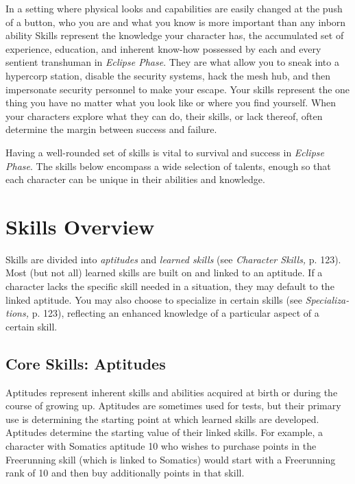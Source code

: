 In a setting where physical looks and capabilities are 
easily changed at the push of a button, who you are and 
what you know is more important than any inborn ability
Skills represent the knowledge your character has,
the accumulated set of experience, education, and inherent
know-how possessed by each and every sentient
transhuman in \textit{Eclipse Phase}. They are what allow you 
to sneak into a hypercorp station, disable the security 
systems, hack the mesh hub, and then impersonate security
personnel to make your escape. Your skills represent
the one thing you have no matter what you look like or 
where you find yourself. When your characters explore 
what they can do, their skills, or lack thereof, often determine
the margin between success and failure.

Having a well-rounded set of skills is vital to survival 
and success in \textit{Eclipse Phase}. The skills below encompass 
a wide selection of talents, enough so that each character 
can be unique in their abilities and knowledge.

\section{Skills Overview}

Skills are divided into \textit{aptitudes} and \textit{learned skills }(see 
\textit{Character Skills,} p. 123). Most (but not all) learned 
skills are built on and linked to an aptitude. If a 
character lacks the specific skill needed in a situation, 
they may default to the linked aptitude. You may also 
choose to specialize in certain skills (see \textit{Specializa-}
\textit{tions,} p. 123), reflecting an enhanced knowledge of a 
particular aspect of a certain skill.

\subsection{Core Skills: Aptitudes}

Aptitudes represent inherent skills and abilities acquired 
at birth or during the course of growing up. Aptitudes 
are sometimes used for tests, but their primary use is 
determining the starting point at which learned skills 
are developed. Aptitudes determine the starting value 
of their linked skills. For example, a character with 
Somatics aptitude 10 who wishes to purchase points 
in the Freerunning skill (which is linked to Somatics) 
would start with a Freerunning rank of 10 and then 
buy additionally points in that skill.

